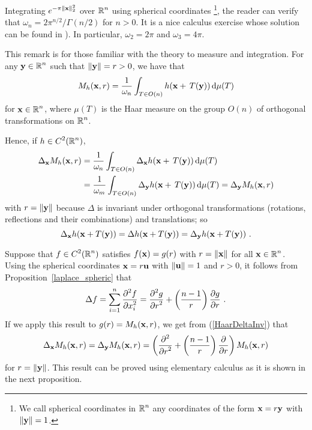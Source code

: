Integrating $\displaystyle e^{-\pi \|\mathbf{x}\|_2^2}$ over
$\displaystyle \mathbb{R}^n$ using spherical coordinates \footnote{We call
spherical coordinates in $\displaystyle \mathbb{R}^n$ any coordinates of the
form $\mathbf{x} = r \mathbf{y}$ with $\|\mathbf{y}\|=1$.}, the reader can verify that
$\displaystyle \omega_n = 2 \pi^{n/2}/\Gamma(n/2)$ for
$n>0$.  It is a nice calculus exercise whose solution can be found in
\cite{FoPDE}).  In particular, $\omega_2 = 2\pi$ and $\omega_3 = 4\pi$. 

\begin{rmk}
This remark is for those familiar with the theory to measure and
integration.
For any $\displaystyle \mathbf{y} \in \mathbb{R}^n$ such that
$\|\mathbf{y}\| = r> 0$, we have that
\[
M_h(\mathbf{x},r) =
\frac{1}{\omega_n} \int_{T\in O(n)} h(\mathbf{x}+\,T(\mathbf{y}))
\,\mathrm{d}{\mu(T)}
\]
for $\displaystyle \mathbf{x}\in\mathbb{R}^n$,
where $\mu(T)$ is the Haar measure on the group $O(n)$ of orthogonal
transformations on $\displaystyle \mathbb{R}^n$.

Hence, if $\displaystyle h \in C^2(\mathbb{R}^n)$,
\begin{align}
\Delta_{\mathbf{x}} M_h(\mathbf{x},r)
&= \frac{1}{\omega_n} \int_{T\in O(n)} \Delta_{\mathbf{x}} h(\mathbf{x}+\,T(\mathbf{y}))
\,\mathrm{d}{\mu(T)} \nonumber \\
&= \frac{1}{\omega_m} \int_{T\in O(n)} \Delta_{\mathbf{y}} h(\mathbf{x}+\,T(\mathbf{y}))
\,\mathrm{d}{\mu(T)}
= \Delta_{\mathbf{y}} M_h(\mathbf{x},r) \label{HaarDeltaInv}
\end{align}
with $r = \|\mathbf{y}\|$ because $\Delta$ is invariant under orthogonal
transformations (rotations, reflections and their combinations) and
translations; so
\[
\Delta_{\mathbf{x}} h(\mathbf{x}+T(\mathbf{y})) = \Delta h(\mathbf{x}+T(\mathbf{y}))
= \Delta_{\mathbf{y}} h(\mathbf{x}+T(\mathbf{y})) \ .
\]

Suppose that $\displaystyle f \in C^2(\mathbb{R}^n)$ satisfies $f(\mathbf{x}) = g(r)$ with
$r=\|\mathbf{x}\|$ for all $\displaystyle \mathbf{x} \in \mathbb{R}^n$.
Using the spherical coordinates $\mathbf{x} = r \mathbf{u}$ with
$\|\mathbf{u}\|= 1$ and $r>0$, it follows from
Proposition~\ref{laplace_spheric} that
\[
  \Delta f = \sum_{i=1}^n \pdydxn{f}{x_i}{2} 
= \pdydxn{g}{r}{2} + \left(\frac{n-1}{r}\right) \pdydx{g}{r} \ .
\]
If we apply this result to $g(r) = M_h(\mathbf{x},r)$, 
we get from (\ref{HaarDeltaInv}) that
\[
\Delta_{\mathbf{x}} M_h(\mathbf{x},r) = \Delta_{\mathbf{y}} M_h(\mathbf{x},r)
= \left( \frac{\displaystyle \partial^{2}{}} {\displaystyle \partial r^{2}} + \left(\frac{n-1}{r}\right) \frac{\partial{}}{\partial r} \right)
M_h(\mathbf{x},r)
\]
for $r = \|\mathbf{y}\|$.  This result can be proved using elementary
calculus as it is shown in the next proposition.
\end{rmk}

